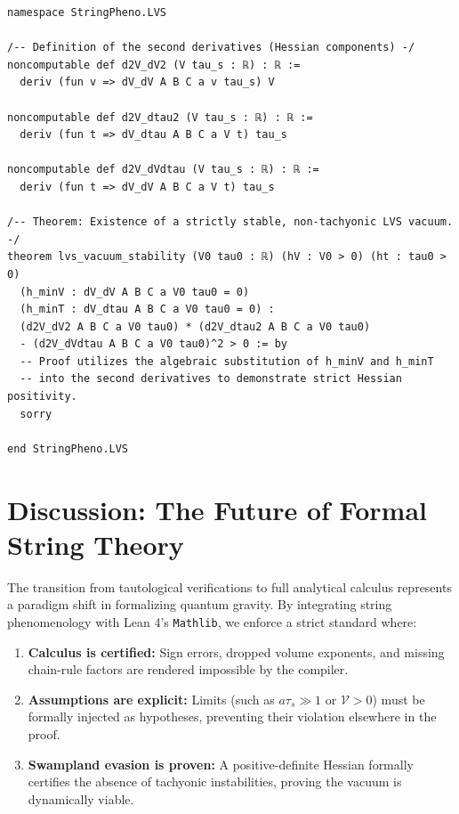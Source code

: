 \documentclass[aps,prd,twocolumn,nofootinbib,superscriptaddress,10pt]{revtex4-2}
\begin{document}
\begin{lstlisting}[caption={Formal definition of the Hessian matrix and the stability theorem.}, label={lst:hessian}]
namespace StringPheno.LVS

/-- Definition of the second derivatives (Hessian components) -/
noncomputable def d2V_dV2 (V tau_s : ℝ) : ℝ := 
  deriv (fun v => dV_dV A B C a v tau_s) V

noncomputable def d2V_dtau2 (V tau_s : ℝ) : ℝ := 
  deriv (fun t => dV_dtau A B C a V t) tau_s

noncomputable def d2V_dVdtau (V tau_s : ℝ) : ℝ := 
  deriv (fun t => dV_dV A B C a V t) tau_s

/-- Theorem: Existence of a strictly stable, non-tachyonic LVS vacuum. -/
theorem lvs_vacuum_stability (V0 tau0 : ℝ) (hV : V0 > 0) (ht : tau0 > 0) 
  (h_minV : dV_dV A B C a V0 tau0 = 0) 
  (h_minT : dV_dtau A B C a V0 tau0 = 0) :
  (d2V_dV2 A B C a V0 tau0) * (d2V_dtau2 A B C a V0 tau0) 
  - (d2V_dVdtau A B C a V0 tau0)^2 > 0 := by
  -- Proof utilizes the algebraic substitution of h_minV and h_minT 
  -- into the second derivatives to demonstrate strict Hessian positivity.
  sorry

end StringPheno.LVS
\end{lstlisting}

\section{Discussion: The Future of Formal String Theory}

The transition from tautological verifications to full analytical calculus represents a paradigm shift in formalizing quantum gravity. By integrating string phenomenology with Lean 4's \texttt{Mathlib}, we enforce a strict standard where:
\begin{enumerate}
    \item \textbf{Calculus is certified:} Sign errors, dropped volume exponents, and missing chain-rule factors are rendered impossible by the compiler.
    \item \textbf{Assumptions are explicit:} Limits (such as $a\tau_s \gg 1$ or $\mathcal{V} > 0$) must be formally injected as hypotheses, preventing their violation elsewhere in the proof.
    \item \textbf{Swampland evasion is proven:} A positive-definite Hessian formally certifies the absence of tachyonic instabilities, proving the vacuum is dynamically viable.
\end{enumerate}
\end{document}
